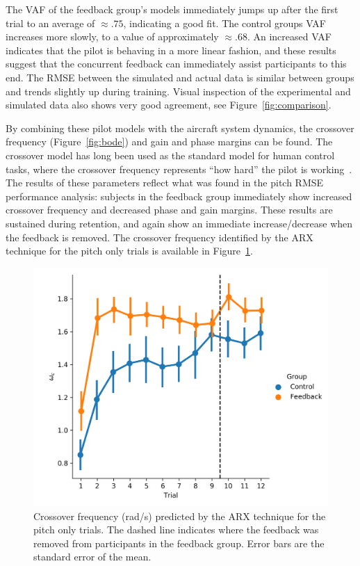 The VAF of the feedback group's models immediately jumps up after the first trial to an average of $\approx.75$, indicating a good fit.
The control groups VAF increases more slowly, to a value of approximately $\approx.68$.
An increased VAF indicates that the pilot is behaving in a more linear fashion, and these results suggest that the concurrent feedback can immediately assist participants to this end.
The RMSE between the simulated and actual data is similar between groups and trends slightly up during training.
Visual inspection of the experimental and simulated data also shows very good agreement, see Figure~\ref{fig:comparison}.

By combining these pilot models with the aircraft system dynamics, the crossover frequency (Figure~\ref{fig:bode}) and gain and phase margins can be found.
The crossover model has long been used as the standard model for human control tasks, where the crossover frequency represents ``how hard'' the pilot is working~\citep{mcruer_dynamic_1957}.
The results of these parameters reflect what was found in the pitch RMSE performance analysis: subjects in the feedback group immediately show increased crossover frequency and decreased phase and gain margins.
These results are sustained during retention, and again show an immediate increase/decrease when the feedback is removed.
The crossover frequency identified by the ARX technique for the pitch only trials is available in Figure~\ref{fig:arx_crossover}.

\begin{figure}[tb]
    \centering
    \includegraphics[width=0.8\linewidth]{figures/Modeling/wc_arx.png}
    \caption[Crossover frequency (ARX)]{Crossover frequency (rad/s) predicted by the ARX technique for the pitch only trials.
    The dashed line indicates where the feedback was removed from participants in the feedback group.
    Error bars are the standard error of the mean.}
    \label{fig:arx_crossover}
\end{figure}

